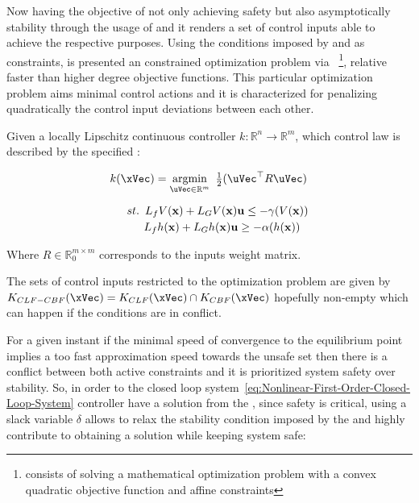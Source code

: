Now having the objective of not only achieving  safety but also asymptotically  stability through the usage of  and  it renders a set of control inputs able to achieve the respective purposes. Using the conditions imposed by  and  as constraints, is presented an constrained optimization problem via ~\footnote{ consists of solving a mathematical optimization problem with a convex quadratic objective function and affine constraints}, relative faster than higher degree objective functions. This particular optimization problem aims minimal control actions and it is characterized for penalizing quadratically the control input deviations between each other. \par
Given a locally Lipschitz continuous controller \(k: \mathbb{R}^n \rightarrow \mathbb{R}^m \), which control law is described by the specified :

\begin{equation}
    \begin{array}{l}
        k(\xVec) = \underset{\uVec \in \mathbb{R}^m }{\mathrm{argmin}} \quad \hspace{-0.5em} \frac{1}{2} (\uVec^\top R \uVec) \vspace{1em} \\  
        \quad \hspace{0.5em}  st. \hspace{0.5em} L_fV(\mathbf{x}) + L_GV(\mathbf{x})\mathbf{u} \leq -\gamma(V(\mathbf{x})) \vspace{0.25em} \\ 
        \quad \quad \hspace{1em} L_fh(\mathbf{x}) + L_Gh(\mathbf{x})\mathbf{u} \geq -\alpha(h(\mathbf{x}))
    \end{array}
 \label{eq:CLF-CBF-QP}
\end{equation}

Where \(R \in \mathbb{R}^{m \times m}_{0}\) corresponds to the inputs weight matrix. \par

The sets of control inputs restricted to the optimization problem are given by \(K_{CLF-CBF}(\xVec) = K_{CLF}(\xVec) \cap  K_{CBF}(\xVec)\) hopefully non-empty which can happen if the conditions are in conflict.  \par

For a given instant if the minimal speed of convergence to the equilibrium point implies a too fast approximation speed towards the unsafe set then there is a conflict between both active constraints and it is prioritized system safety over stability. So, in order to the closed loop system~\ref{eq:Nonlinear-First-Order-Closed-Loop-System} controller have a solution from the , since safety is critical, using a slack variable \(\delta\)  allows to relax the stability condition imposed by the  and highly contribute to obtaining a solution while keeping system safe:

